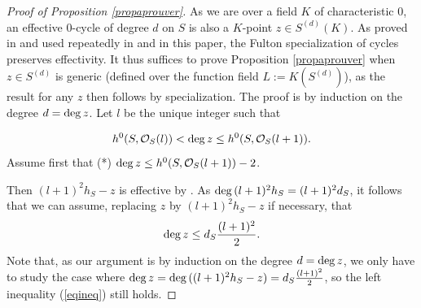 \documentclass[10pt]{article}
\begin{document}
\begin{proof}[Proof of Proposition \ref{propaprouver}]
As we are over a field $K$ of characteristic $0$, an effective $0$-cycle of degree $d$ on $S$ is also a $K$-point $z\in S^{(d)}(K)$. As proved in  \cite[Lemme 2.10]{colliot} and  used repeatedly in \cite{voisindelpezzo} and in this paper, the Fulton specialization of cycles  preserves effectivity. It thus suffices to prove Proposition \ref{propaprouver} when $z\in S^{(d)}$ is generic (defined over the function field  $L:=K(S^{(d)})$), as the result for any $z$  then follows by specialization. The proof is by induction on the degree $d={\rm deg}\,z$.  Let $l$ be the unique integer such that

\begin{eqnarray}\label{eqineq} h^0(S,\mathcal{O}_S(l))< {\rm deg}\,z\leq h^0(S,\mathcal{O}_S(l+1)).
\end{eqnarray}
Assume first that (*) ${\rm deg}\,z\leq h^0(S,\mathcal{O}_S(l+1))-2$.

Then
$(l+1)^2h_S-z$ is effective by \cite[Lemma 3.6]{voisindelpezzo}. As ${\rm deg}\,(l+1)^2h_S=(l+1)^2d_S$, it follows that we can assume,   replacing
$z$ by $(l+1)^2h_S-z$ if necessary, that
\begin{eqnarray} \label{eqinedimres}{\rm deg}\,z \leq d_S\frac{(l+1)^2}{2}.\end{eqnarray}
Note that,   as our argument is  by induction on the degree $d={\rm deg}\,z$, we only have  to study the case where ${\rm deg}\,z ={\rm deg}\,( (l+1)^2h_S-z)= d_S\frac{(l+1)^2}{2}$, so the left inequality (\ref{eqineq}) still holds.


\end{proof}
\end{document}
